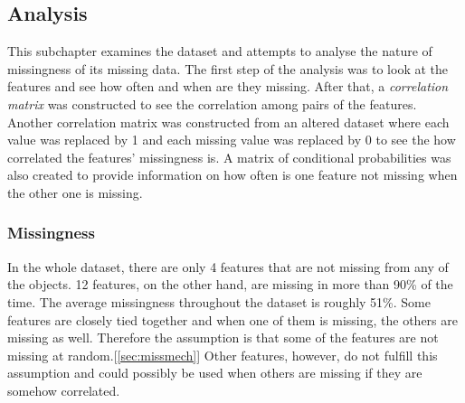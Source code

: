 \documentclass[11pt]{article}
\begin{document}
    \subsection{Analysis}
        \label{sec:analysis}
        This subchapter examines the dataset and attempts to analyse the nature of missingness of its missing data. The first step of the analysis was to look at the features and see how often and when are they missing. After that, a {\it correlation matrix} was constructed to see the correlation among pairs of the features. Another correlation matrix was constructed from an altered dataset where each value was replaced by 1 and each missing value was replaced by 0 to see the how correlated the features' missingness is. A matrix of conditional probabilities was also created to provide information on how often is one feature not missing when the other one is missing.
      \subsubsection{Missingness}
        In the whole dataset, there are only 4 features that are not missing from any of the objects. 12 features, on the other hand, are missing in more than 90\% of the time. The average missingness throughout the dataset is roughly 51\%. Some features are closely tied together and when one of them is missing, the others are missing as well. Therefore the assumption is that some of the features are not missing at random.[\ref{sec:missmech}] Other features, however, do not fulfill this assumption and could possibly be used when others are missing if they are somehow correlated.
\end{document}

